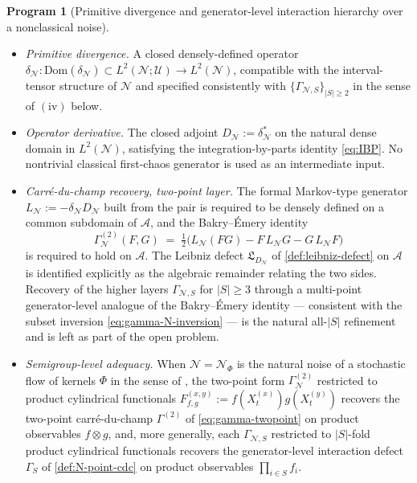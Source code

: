 \documentclass[11pt,reqno]{amsart}
\theoremstyle{plain}
\theoremstyle{definition}
\newtheorem{program}[theorem]{Program}
\theoremstyle{remark}
\newcommand{\Dom}{\mathrm{Dom}}
\begin{document}
\begin{program}[\texorpdfstring{Primitive divergence and generator-level interaction hierarchy over a nonclassical noise}{Primitive divergence and generator-level interaction hierarchy over a nonclassical noise}]
\begin{itemize}
later be derived from the semigroups; it is not part of this
formulation (see \cref{rem:partition-vs-generator}).
\item[$(\mathrm{ii})$] \emph{Primitive divergence.} A closed
densely-defined operator
$\delta_{\mathcal N}\colon\Dom(\delta_{\mathcal N})\subset L^{2}(\mathcal N;\mathcal U)\to L^{2}(\mathcal N)$,
compatible with the interval-tensor structure of $\mathcal N$ and
specified consistently with
$\{\Gamma_{\mathcal N,S}\}_{|S|\ge 2}$ in the sense of
$(\mathrm{iv})$ below.
\item[$(\mathrm{iii})$] \emph{Operator derivative.} The closed
adjoint $D_{\mathcal N}:=\delta_{\mathcal N}^{*}$ on the natural
dense domain in $L^{2}(\mathcal N)$, satisfying the
integration-by-parts identity \eqref{eq:IBP}. No nontrivial
classical first-chaos generator is used as an intermediate input.
\item[$(\mathrm{iv})$] \emph{Carr\'e-du-champ recovery, two-point
layer.} The formal Markov-type generator
$L_{\mathcal N}:=-\delta_{\mathcal N}D_{\mathcal N}$ built from the
pair is required to be densely defined on a common subdomain of
$\mathcal A$, and the Bakry--\'Emery identity
\[
  \Gamma_{\mathcal N}^{(2)}(F,G)
  \;=\;\tfrac{1}{2}\bigl(L_{\mathcal N}(FG)-F\,L_{\mathcal N}G-G\,L_{\mathcal N}F\bigr)
\]
is required to hold on $\mathcal A$. The Leibniz defect
$\mathfrak L_{D_{\mathcal N}}$ of \cref{def:leibniz-defect} on
$\mathcal A$ is identified explicitly as the algebraic remainder
relating the two sides. Recovery of the higher layers
$\Gamma_{\mathcal N,S}$ for $|S|\ge 3$ through a multi-point
generator-level analogue of the Bakry--\'Emery identity ---
consistent with the subset inversion \eqref{eq:gamma-N-inversion}
--- is the natural all-$|S|$ refinement and is left as part of the
open problem.
\item[$(\mathrm v)$] \emph{Semigroup-level adequacy.} When
$\mathcal N=\mathcal N_{\Phi}$ is the natural noise of a stochastic
flow of kernels $\Phi$ in the sense of \cite{LeJanRaimond2004}, the
two-point form $\Gamma_{\mathcal N}^{(2)}$ restricted to product
cylindrical functionals
$F_{f,g}^{(x,y)}:=f(X_t^{(x)})g(X_t^{(y)})$ recovers the two-point
carr\'e-du-champ $\Gamma^{(2)}$ of \eqref{eq:gamma-twopoint} on
product observables $f\otimes g$, and, more generally, each
$\Gamma_{\mathcal N,S}$ restricted to $|S|$-fold product cylindrical
functionals recovers the generator-level interaction defect
$\Gamma_S$ of \cref{def:N-point-cdc} on product observables
$\prod_{i\in S}f_i$.
\end{itemize}
\end{program}
\end{document}
